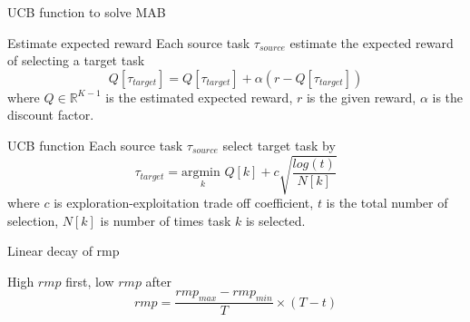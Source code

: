 \begin{frame}{UCB function to solve MAB}
    \begin{block}{Estimate expected reward}
        Each source task $\tau_{source}$ estimate the expected reward of selecting a target task 
        \begin{equation}
            Q[\tau_{target}] = Q[\tau_{target}] + \alpha(r - Q[\tau_{target}])
            \label{eq:estimate}
        \end{equation}
        where $Q \in \mathbb{R} ^ {K - 1}$ is the estimated expected reward, $r$ is the given reward, $\alpha$ is the discount factor.
    \end{block}
    \begin{block}{UCB function}
        Each source task $\tau_{source}$ select target task by
        \begin{equation}
            \tau_{target} = \underset{k}{\text{argmin }} Q[k] + c \sqrt{\frac{log(t)}{N[k]}}
            \label{eq:ucb}
        \end{equation}
        where $c$ is exploration-exploitation trade off coefficient, $t$ is the total number of selection, $N[k]$ is number of times task $k$ is selected.
    \end{block}
\end{frame}

\begin{frame}{Linear decay of rmp}
    \begin{block}{High $rmp$ first, low $rmp$ after}
        \begin{equation}
            rmp = \frac{rmp_{max} - rmp_{min}}{T} \times (T - t)
        \end{equation}
    \end{block}
\end{frame}

